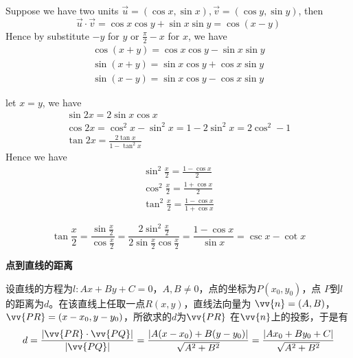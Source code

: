 \documentclass{article}
\begin{document}
Suppose we have two units \(\vec{u}=(\cos x,\sin x),\vec{v}=(\cos y,\sin
   y)\), then
\begin{equation*}
\vec{u}\cdot\vec{v}=\cos x\cos y+\sin x\sin y=\cos(x-y)
\end{equation*}
Hence by substitute \(-y\) for \(y\) or \(\frac{\pi}{2}-x\) for \(x\), we have
\begin{gather*}
\cos(x+y)=\cos x\cos y-\sin x\sin y\\
\sin(x+y)=\sin x\cos y+\cos x\sin y\\
\sin(x-y)=\sin x\cos y-\cos x\sin y
\end{gather*}

let \(x=y\), we have
\begin{gather*}
\sin 2x=2\sin x\cos x\\
\cos 2x=\cos^2x-\sin^2x=1-2\sin^2 x=2\cos^2-1\\
\tan 2x=\frac{2\tan x}{1-\tan^2x}
\end{gather*}
Hence we have
\begin{gather*}
\sin^2\frac{x}{2}=\frac{1-\cos x}{2}\\
\cos^2\frac{x}{2}=\frac{1+\cos x}{2}\\
\tan^2\frac{x}{2}=\frac{1-\cos x}{1+\cos x}
\end{gather*}

\begin{equation*}
\tan\frac{x}{2}=\frac{\sin\frac{x}{2}}{\cos\frac{x}{2}}=
\frac{2\sin^2\frac{x}{2}}{2\sin\frac{x}{2}\cos\frac{x}{2}}=
\frac{1-\cos x}{\sin x}=\csc x-\cot x
\end{equation*}

\textbf{点到直线的距离}

设直线的方程为\(l:Ax+By+C=0\)，\(A,B\neq0\)，点的坐标为\(P(x_0,y_0)\)，点
\(P\)到\(l\)的距离为\(d\)。在该直线上任取一点\(R(x,y)\)，直线法向量为
\(\vv{n}=(A,B)\)，\(\vv{PR}=(x-x_0,y-y_0)\)，所欲求的\(d\)为\(\vv{PR}\)
在\(\vv{n}\)上的投影，于是有
\begin{equation*}
d=\frac{\abs{\vv{PR}\cdot\vv{PQ}}}{\abs{\vv{PQ}}}=
\frac{\abs{A(x-x_0)+B(y-y_0)}}{\sqrt{A^2+B^2}}=\frac{\abs{Ax_0+By_0+C}}{\sqrt{A^2+B^2}}
\end{equation*}
\end{document}
